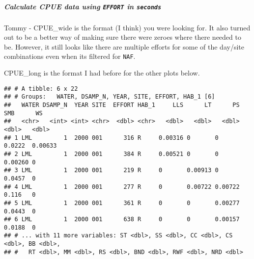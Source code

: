 \documentclass[
]{article}
\newenvironment{Shaded}{\begin{snugshade}}{\end{snugshade}}
\newcommand{\CommentTok}[1]{\textcolor[rgb]{0.56,0.35,0.01}{\textit{#1}}}
\newcommand{\DataTypeTok}[1]{\textcolor[rgb]{0.13,0.29,0.53}{#1}}
\newcommand{\DecValTok}[1]{\textcolor[rgb]{0.00,0.00,0.81}{#1}}
\newcommand{\KeywordTok}[1]{\textcolor[rgb]{0.13,0.29,0.53}{\textbf{#1}}}
\newcommand{\NormalTok}[1]{#1}
\newcommand{\OperatorTok}[1]{\textcolor[rgb]{0.81,0.36,0.00}{\textbf{#1}}}
\newcommand{\StringTok}[1]{\textcolor[rgb]{0.31,0.60,0.02}{#1}}
\begin{document}
\hypertarget{calculate-cpue-data-using-effort-in-seconds}{%
\subparagraph{\texorpdfstring{Calculate CPUE data using \texttt{EFFORT}
in
\texttt{seconds}}{Calculate CPUE data using EFFORT in seconds}}\label{calculate-cpue-data-using-effort-in-seconds}}

Tommy - CPUE\_wide is the format (I think) you were looking for. It also
turned out to be a better way of making sure there were zeroes where
there needed to be. However, it still looks like there are multiple
efforts for some of the day/site combinations even when its filtered for
\texttt{NAF}.

CPUE\_long is the format I had before for the other plots below.

\begin{Shaded}
\end{Shaded}

\begin{verbatim}
## # A tibble: 6 x 22
## # Groups:   WATER, DSAMP_N, YEAR, SITE, EFFORT, HAB_1 [6]
##   WATER DSAMP_N  YEAR SITE  EFFORT HAB_1     LLS      LT      PS     SMB      WS
##   <chr>   <int> <int> <chr>  <dbl> <chr>   <dbl>   <dbl>   <dbl>   <dbl>   <dbl>
## 1 LML         1  2000 001      316 R     0.00316 0       0       0.0222  0.00633
## 2 LML         1  2000 001      384 R     0.00521 0       0       0.00260 0      
## 3 LML         1  2000 001      219 R     0       0.00913 0       0.0457  0      
## 4 LML         1  2000 001      277 R     0       0.00722 0.00722 0.116   0      
## 5 LML         1  2000 001      361 R     0       0       0.00277 0.0443  0      
## 6 LML         1  2000 001      638 R     0       0       0.00157 0.0188  0      
## # ... with 11 more variables: ST <dbl>, SS <dbl>, CC <dbl>, CS <dbl>, BB <dbl>,
## #   RT <dbl>, MM <dbl>, RS <dbl>, BND <dbl>, RWF <dbl>, NRD <dbl>
\end{verbatim}
\end{document}
